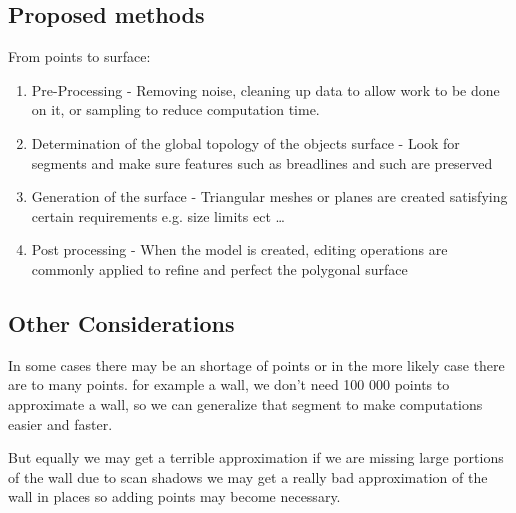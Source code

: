 \subsection{Proposed methods}


From points to surface:

\begin{enumerate}
\item Pre-Processing - Removing noise, cleaning up data to allow work to be done on it, or sampling to reduce computation time.

\item Determination of the global topology of the objects surface - Look for segments and make sure features such as breadlines and such are preserved
	
\item Generation of the surface - Triangular meshes or planes are created satisfying certain requirements e.g. size limits ect \ldots

\item Post processing - When the model is created, editing operations are commonly applied to refine and perfect the polygonal surface
\end{enumerate}

\subsection{Other Considerations}

In some cases there may be an shortage of points or in the more likely case there are to many points. for example a wall, we don't need 100 000 points to approximate a wall, so we can generalize that segment to make computations easier and faster.

But equally we may get a terrible approximation if we are missing large portions of the wall due to scan shadows we may get a really bad approximation of the wall in places so adding points may become necessary.




















